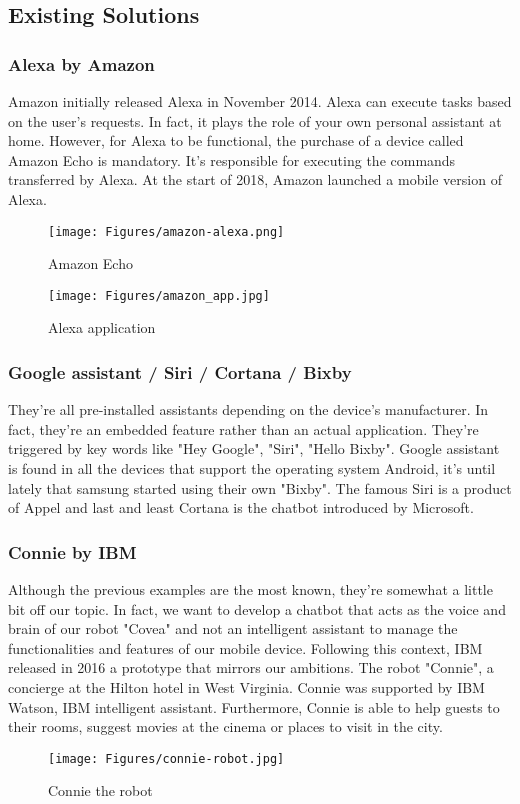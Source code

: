 \subsection{Existing Solutions}
\subsubsection{Alexa by Amazon}
Amazon initially released Alexa in November 2014. Alexa can execute tasks based on the user's requests. In fact, it plays the role of your own personal assistant at home. However, for Alexa to be functional, the purchase of a device called Amazon Echo is mandatory. It's responsible for executing  the commands transferred by Alexa. At the start of 2018, Amazon launched a mobile version of Alexa.
\begin{figure}[H]
\centering
\begin{minipage}{.5\textwidth}
  \centering
  \texttt{[image: Figures/amazon-alexa.png]}
  \caption{Amazon Echo}
  \label{fig:Amazon Echo}
\end{minipage}%
\begin{minipage}{.5\textwidth}
  \centering
  \texttt{[image: Figures/amazon\_app.jpg]}
  \caption{Alexa application}
  \label{fig:test2}
\end{minipage}
\end{figure}

\subsubsection{Google assistant / Siri / Cortana / Bixby}
They're all pre-installed assistants depending on the device's manufacturer. In fact, they're an embedded feature rather than an actual application. They're triggered by key words like "Hey Google", "Siri", "Hello Bixby". Google assistant is found in all the devices that support the operating system Android, it's until lately that samsung started using their own "Bixby". The famous Siri is a product of Appel and last and least Cortana is the chatbot introduced by Microsoft.
\subsubsection{Connie by IBM}
Although the previous examples are the most known, they're somewhat a little bit off our topic. In fact, we want to develop a chatbot that acts as the voice and brain of our robot "Covea" and not an intelligent assistant to manage the functionalities and features of our mobile device. Following this context, IBM released in 2016 a prototype that mirrors our ambitions. The robot "Connie", a concierge at the Hilton hotel in West Virginia. Connie was supported by IBM Watson, IBM intelligent assistant. Furthermore, Connie is able to help guests to their rooms, suggest movies at the cinema or places to visit in the city.
\begin{figure}[H]
\centering
\texttt{[image: Figures/connie-robot.jpg]}
\caption{Connie the robot}
\label{fig:connie}
\end{figure}
